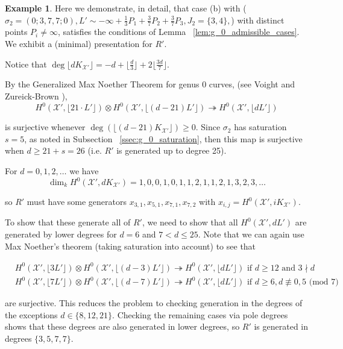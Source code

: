 \documentclass{amsart}
\theoremstyle{plain}
\theoremstyle{definition}
\newtheorem{example}[thm]{Example}
\theoremstyle{remark}
\numberwithin{equation}{section}
\newcommand \sx{\mathscr X}
\newcommand \halfcan{L}
\begin{document}
\begin{example}
\label{ex:base-377}
Here we demonstrate, in detail, that case (b) with ($\sigma_2 =
(0; 3, 7, 7; 0), \halfcan' \sim -\infty + \frac{1}{3} P_1 +
\frac{3}{7} P_2 + \frac{3}{7} P_3, J_2 = \{3, 4\},$) with distinct points $P_i \neq \infty$,
satisfies the conditions of Lemma ~\ref{lem:g_0_admissible_cases}.
We exhibit a (minimal) presentation for $R'$.

Notice that $\deg \lfloor d K_{\sx'} \rfloor= -d + \lfloor \frac{d}{3}
\rfloor + 2 \lfloor \frac{3d}{7} \rfloor$.

By the Generalized Max Noether Theorem for genus 0 curves, (see Voight
and Zureick-Brown \cite[Lemma 3.1.1]{vzb:stacky}),
\[
	H^0 (\sx', \lfloor 21 \cdot \halfcan' \rfloor) \otimes H^0 (\sx', \lfloor
	(d - 21) \halfcan' \rfloor) \twoheadrightarrow H^0 (\sx', \lfloor
	d \halfcan' \rfloor)
\]

\noindent
is surjective whenever $\deg (\lfloor (d - 21) K_{\sx'} \rfloor)
\geq 0$. Since $\sigma_2$ has saturation $s = 5$, as noted in
Subsection ~\ref{ssec:g_0_saturation}, then this map is surjective
when $d \geq 21 + s = 26$ (i.e. $R'$ is generated up to degree 25).

For $d = 0, 1, 2, \ldots$ we have
\[
	\dim_k H^0 (\sx', d K_{\sx'}) = 1, 0, 0, 1, 0, 1, 1, 2, 1, 1, 2, 1, 3, 2, 3, \ldots
\]

\noindent
so $R'$ must have some generators $x_{3, 1}, x_{5, 1}, x_{7, 1},
x_{7, 2}$ with $x_{i,j} = H^0(\sx',iK_{\sx'})$.

To show that these generate all of $R'$, we need to show that all
$H^0 (\sx', d \halfcan')$ are generated by lower degrees for $d = 6$
and $7 < d \leq 25$. Note that we can again use Max Noether's theorem
(taking saturation into account) to see that

\begin{align*}
	&H^0 (\sx', \lfloor 3 \halfcan' \rfloor) \otimes H^0 (\sx', \lfloor
	(d - 3) \halfcan' \rfloor) \twoheadrightarrow H^0 (\sx', \lfloor
	d \halfcan' \rfloor) \text{ if } d \geq 12 \text{ and } 3 \nmid d \\
	&H^0 (\sx', \lfloor 7 \halfcan' \rfloor) \otimes H^0 (\sx', \lfloor
	(d - 7) \halfcan' \rfloor) \twoheadrightarrow H^0 (\sx', \lfloor
	d \halfcan' \rfloor) \text{ if } d \geq 6, d \not\equiv 0, 5
	\text{ (mod } 7)
\end{align*}

\noindent
are surjective. This reduces the problem to checking generation
in the degrees of the exceptions $d \in \{8, 12, 21\}$.
Checking the remaining cases via pole degrees shows that
these degrees are also generated in lower degrees,
so $R'$ is generated in degrees $\{3, 5, 7, 7\}$.


\end{example}
\end{document}
